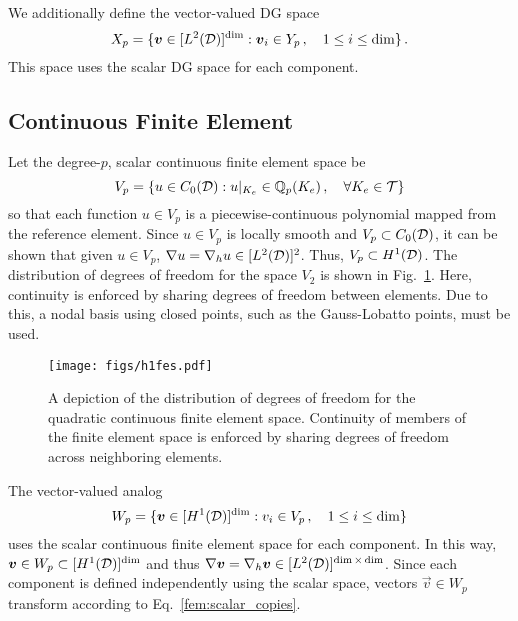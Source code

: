 \documentclass[../doc.tex]{subfiles}
\begin{document}
We additionally define the vector-valued DG space 
	\begin{equation}
		X_p = \{ \boldsymbol{v} \in [L^2(\mathcal{D})]^{\dim} : \boldsymbol{v}_i \in Y_p \,, \quad 1 \leq i \leq \dim \} \,. 
	\end{equation}
This space uses the scalar DG space for each component. 

\subsection{Continuous Finite Element}
Let the degree-$p$, scalar continuous finite element space be
	\begin{equation}
		V_p = \{ u \in C_0(\mathcal{D}) : u|_{K_e} \in \mathbb{Q}_{p}(K_e) \,, \quad \forall K_e \in\mathcal{T} \} 
	\end{equation}
so that each function $u\in V_p$ is a piecewise-continuous polynomial mapped from the reference element. Since $u \in V_p$ is locally smooth and $V_p \subset C_0(\mathcal{D})$, it can be shown that given $u\in V_p$, $\nabla u = \nabla_h u \in [L^2(\mathcal{D})]^2$. Thus, $V_p \subset H^1(\mathcal{D})$. The distribution of degrees of freedom for the space $V_2$ is shown in Fig.~\ref{fem:h1fes}. Here, continuity is enforced by sharing degrees of freedom between elements. Due to this, a nodal basis using closed points, such as the Gauss-Lobatto points, must be used. 
\begin{figure}
\centering
\texttt{[image: figs/h1fes.pdf]}
\caption{A depiction of the distribution of degrees of freedom for the quadratic continuous finite element space. Continuity of members of the finite element space is enforced by sharing degrees of freedom across neighboring elements.}
\label{fem:h1fes}
\end{figure}

The vector-valued analog 
	\begin{equation}
		W_p = \{ \boldsymbol{v} \in [H^1(\mathcal{D})]^{\dim}: v_i \in V_p \,, \quad 1 \leq i \leq \dim \} 
	\end{equation}
uses the scalar continuous finite element space for each component. In this way, $\boldsymbol{v} \in W_p \subset [H^1(\mathcal{D})]^{\dim}$ and thus $\nabla\boldsymbol{v} = \nabla_h\boldsymbol{v} \in [L^2(\mathcal{D})]^{\dim\times\dim}$. Since each component is defined independently using the scalar space, vectors $\vec{v} \in W_p$ transform according to Eq.~\ref{fem:scalar_copies}. 
\end{document}
